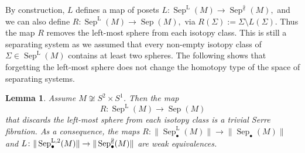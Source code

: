 \documentclass{amsart}
\theoremstyle{plain}
\newtheorem{lem}[thm]{Lemma}
\theoremstyle{definition}
\DeclareMathOperator\sep{Sep} %
\newcommand{\sepNP}{\sep^{\nparallel}} %
\newcommand{\sepL}{\sep^{\mathrm{L}}} %
\begin{document}
By construction, $L$ defines a map of posets $
    L\colon \sepL(M) \longrightarrow \sepNP(M),
$
and we can also define 
$
    R\colon \sepL(M) \longrightarrow \sep(M),$ via $
    R(\Sigma) := \Sigma \setminus L(\Sigma).
$
Thus the map $R$ removes the left-most sphere from each isotopy class.
This is still a separating system as we assumed that every non-empty isotopy class of $\Sigma \in \sepL(M)$ contains at least two spheres. The following shows that forgetting the left-most sphere does not change the homotopy type of the space of separating systems.
\begin{lem}\label{lem:forget-left-most-sphere}
    Assume $M \not\cong S^2 \times S^1$.
    Then the map
    \[
        R\colon \sepL(M) \longrightarrow \sep(M)
    \]
    that discards the left-most sphere from each isotopy class is a trivial Serre fibration.
    As a consequence, the maps
    $R\colon \|\sepL_\bullet(M)\| \to \|\sep_\bullet(M)\|$ and
    $L\colon \|\sep^{\rm L,2}_\bullet(M)\| \to \|\sepNP_\bullet(M)\|$
    are weak equivalences.
\end{lem}
\end{document}
